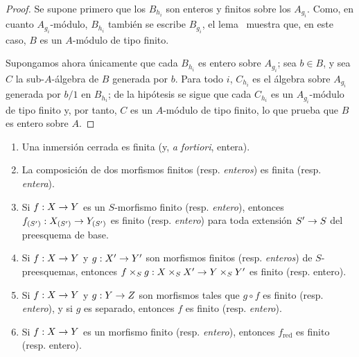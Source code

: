 \documentclass[oneside,10pt]{amsart}
\makeatletter
\newcommand{\ega@arrow}[2]{\mathchoice{#1}{#2}{#2}{#2}}
\renewcommand{\to}{\ega@arrow{\longrightarrow}{\rightarrow}}
\let\EGAOriginalLabel\label
\renewcommand{\label}[1]{\phantomsection\EGAOriginalLabel{#1}}
\makeatother
\begin{document}
\begin{proof}
Se supone primero que los $B_{h_i}$ son enteros y finitos sobre los $A_{g_i}$.
Como, en cuanto $A_{g_i}$-módulo, $B_{h_i}$ también se escribe $B_{g_i}$, el lema~ muestra que, en este caso, $B$ es un $A$-módulo de tipo finito.

Supongamos ahora únicamente que cada $B_{h_i}$ es entero sobre $A_{g_i}$;
sea $b\in B$, y sea $C$ la sub-$A$-álgebra de $B$ generada por $b$.
Para todo $i$, $C_{h_i}$ es el álgebra sobre $A_{g_i}$ generada por $b/1$ en $B_{h_i}$;
de la hipótesis se sigue que cada $C_{h_i}$ es un $A_{g_i}$-módulo de tipo finito y, por tanto,  $C$ es un $A$-módulo de tipo finito, lo que prueba que $B$ es entero sobre $A$.
\end{proof}

\begin{proposition}[6.1.5]
\label{II.6.1.5-fr}
\medskip\noindent
\begin{enumerate}
  \item[{\rm(i)}] Una inmersión cerrada es finita (y, \emph{a fortiori}, entera).
  \item[{\rm(ii)}] La composición de dos morfismos finitos \textup{(resp. \emph{enteros})} es finita \textup{(resp. \emph{entera})}.
  \item[{\rm(iii)}] Si $f:X\to Y$ es un $S$-morfismo finito \textup{(resp. \emph{entero})}, entonces $f_{(S')}:X_{(S')}\to Y_{(S')}$ es finito \textup{(resp. \emph{entero})} para toda extensión $S'\to S$ del preesquema de base.
  \item[{\rm(iv)}] Si $f:X\to Y$ y $g:X'\to Y'$ son morfismos finitos \textup{(resp. \emph{enteros})} de $S$-preesquemas, entonces $f\times_S g:X\times_S X'\to Y\times_S Y'$ es finito (resp. entero).
  \item[{\rm(v)}] Si $f:X\to Y$ y $g:Y\to Z$ son morfismos tales que $g\circ
f$ es finito \textup{(resp. \emph{entero})}, y si $g$ es separado, entonces $f$ es finito \textup{(resp. \emph{entero})}.
  \item[{\rm(vi)}] Si $f:X\to Y$ es un morfismo finito \textup{(resp. \emph{entero})}, entonces $f_{\mathrm{red}}$ es finito (resp. entero).
\end{enumerate}
\end{proposition}
\end{document}
